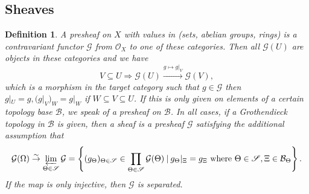 \documentclass[8pt]{article}
\numberwithin{equation}{section}
\newtheorem{definition}{Definition}[subsection]
\newcommand{\Ouv}{\mathscr{O}}
\newcommand{\sep}[0]{\:|\:}
\newcommand{\sS}[0]{\mathscr{S}}
\newcommand{\cB}[0]{\mathcal{B}}
\newcommand{\cG}[0]{\mathcal{G}}
\begin{document}
\subsection{Sheaves}
\begin{definition}
    \label{definition_10_1}
    A presheaf on $X$ with values in (sets, abelian groups, rings) is a contravariant functor $\mathcal{G}$ from $\Ouv_X$ to one of these categories. Then all $\mathcal{G}(U)$ are objects in these categories and we have
    \begin{equation*}
    V\subseteq U\Rightarrow \mathcal{G}(U)\stackrel{g\mapsto g|_V}{\to}\mathcal{G}(V),
    \end{equation*}
    which is a morphism in the target category such that $g\in\mathcal{G}$ then $g|_U = g,(g|_V)_W=g|_W$ if $W\subseteq V\subseteq U$.
    If this is only given on elements of a certain topology base $\cB$, we speak of a presheaf on $\cB$. In all cases, if a Grothendieck topology in $\cB$ is given, then a sheaf is a presheaf $\mathcal{G}$ satisfying the additional assumption that 
    \begin{equation*}
        \mathcal{G}(\Omega)\stackrel{\sim}{\to}\varprojlim_{\Theta\in\sS}\mathcal{G} = \left\{(g_\Theta)_{\Theta\in\sS}\in\prod_{\Theta\in\sS}\mathcal{G}(\Theta)\sep g_\Theta|_{\Xi} = g_\Xi\text{ where $\Theta\in\sS, \Xi\in\cB_\Theta$}\right\}.
    \end{equation*}
    If the map is only injective, then $\cG$ is separated.
\end{definition}
\end{document}
